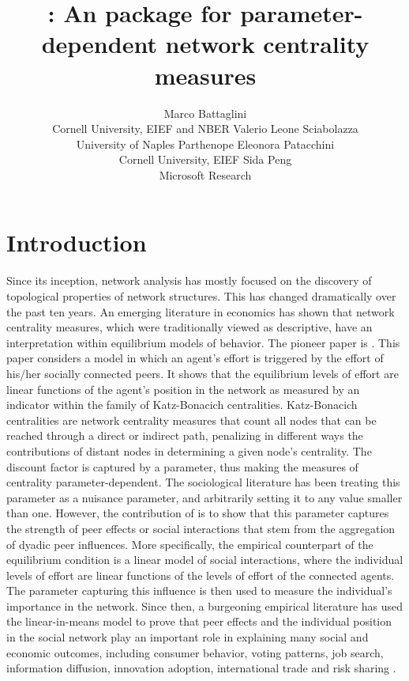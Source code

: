 \documentclass[nojss]{jss}
\author{Marco Battaglini\\Cornell University, EIEF and NBER
\And Valerio Leone Sciabolazza\\University of Naples Parthenope \AND Eleonora Patacchini\\ Cornell University, EIEF \And Sida Peng\\Microsoft Research}
\title{\pkg{econet}: An \proglang{R} package for parameter-dependent network centrality measures}
\begin{document}
\section{Introduction} \label{sec:intro}

Since its inception, network analysis has mostly focused on the discovery of topological properties of network structures. This has changed dramatically over the past ten years. An emerging literature in economics has shown that network centrality measures, which were traditionally viewed as descriptive, have an interpretation within equilibrium models of behavior. The pioneer paper is \cite{Ballester+Armengol+Zenou:2006}. This paper considers a model in which an agent's effort is triggered by the effort of his/her socially connected peers. It shows that the equilibrium  levels of effort are linear functions of the agent's position in the network as measured by an indicator within the family of Katz-Bonacich centralities. Katz-Bonacich centralities 
\citep{Katz:1953,Bonacich:1972,Bonacich:1987} are network centrality measures that count all nodes that can be reached through a direct or indirect path, penalizing in different ways the contributions of distant nodes in determining a given node's centrality. The discount factor is captured by a parameter, thus making the measures of centrality parameter-dependent. The sociological literature has been treating this parameter as a nuisance parameter, and arbitrarily setting it to any value smaller than one. However, the contribution of \cite{Ballester+Armengol+Zenou:2006} is to show that this parameter captures the strength of peer effects or social interactions that stem from the aggregation of dyadic peer influences. More specifically, the empirical counterpart of the \cite{Ballester+Armengol+Zenou:2006} equilibrium condition is a linear model of social interactions, where the individual  levels of effort are linear functions of the levels of effort of the connected agents. The parameter capturing this influence is then used to measure the individual's importance in the network. Since then, a burgeoning empirical literature has used the linear-in-means model to prove that peer effects and the individual position in the social network play an important role in explaining many social and economic outcomes, including consumer behavior, voting patterns, job search, information diffusion, innovation adoption, international trade and risk sharing \citep[see e.g.,][for recent reviews]{An:2011,An:2015a,Jackson+Rogers+Zenou:2017,Hsieh:2020,Zenou:2016}.
\end{document}
